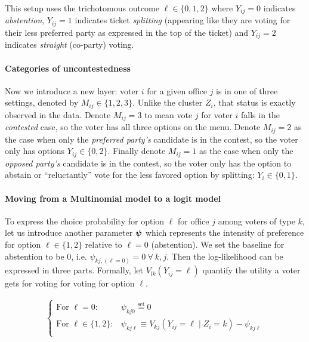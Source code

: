 \documentclass[11pt]{article}
\begin{document}
This setup uses the trichotomous outcome \(\ell \in \{0, 1,  2\}\) where \(Y_{ij} = 0\) indicates \emph{abstention}, \(Y_{ij} = 1\) indicates ticket \emph{splitting} (appearing like they are voting for their less preferred party as expressed in the top of the ticket) and \(Y_{ij} = 2\) indicates \emph{straight} (co-party) voting.  

\paragraph{Categories of uncontestedness} Now we introduce a new layer: voter \(i\) for a given office \(j\) is in one of three settings, denoted by \(M_{ij} \in \{1, 2, 3\}\). Unlike the cluster \(Z_i\), that status is exactly observed in the data. Denote \(M_{ij} = 3\) to mean vote \(j\) for voter \(i\) falls in the \emph{contested} case, so the voter has all three options on the menu. Denote \(M_{ij} = 2\) as the case when only the \emph{preferred party's} candidate is in the contest, so the voter only has options \(Y_{ij} \in \{0, 2\}\). Finally denote \(M_{ij} = 1\) as the case when only the \emph{opposed party's} candidate is in the contest, so the voter only has the option to abstain or ``reluctantly'' vote for the less favored option by splitting: \(Y_{i} \in \{0, 1\}\).

\paragraph{Moving from a Multinomial model to a logit model} To express the choice probability for option \(\ell\) for office \(j\) among voters of type \(k\), let us introduce another parameter \(\bm{\psi}\) which represents the intensity of preference for option \(\ell \in \{1, 2\}\) relative to \(\ell = 0\) (abstention). We set the baseline for abstention to be 0, i.e. \(\psi_{kj,(\ell=0)} = 0 ~\forall~ k, j\).  Then the log-likelihood can be expressed in three parts. Formally, let \(V_{lk}(Y_{ij} = \ell)\) quantify the utility a voter gets for voting for voting for option \(\ell\).
 
\begin{align*}
\begin{cases}
\text{For }\ell = 0: & \psi_{kj0} \stackrel{\text{set}}{=} 0\\
\text{For }\ell \in \{1, 2\}: & \psi_{kj\ell} \equiv V_{kj}(Y_{ij} = \ell \mid Z_i = k) - \psi_{kj\ell}\\
\end{cases}
\end{align*}
\end{document}
